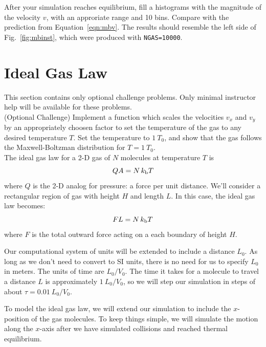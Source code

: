 {\plot After your simulation reaches equilibrium, fill a histograms
with the magnitude of the velocity $v$, with an approriate range and
10 bins.  Compare with the prediction from Equation~\ref{eqn:mbv}.
The results should resemble the left side of Fig.~\ref{fig:mbinst},
which were produced with {\tt NGAS=10000}.\\

\section{Ideal Gas Law}
\label{sec:idealgas}

This section contains only optional challenge problems.  Only minimal
instructor help will be available for these problems.\\

\plot (Optional Challenge) Implement a function which scales the
velocities $v_x$ and $v_y$ by an appropriately choosen factor to set
the temperature of the gas to any desired temperature $T$.  Set the
temperature to $1~T_0$, and show that the gas follows the
Maxwell-Boltzman distribution for $T=1~T_0$.\\

The ideal gas law for a 2-D gas of $N$ molecules at temperature $T$ is
\begin{displaymath}
  Q A = N \, k_{\rm b} T
\end{displaymath}
where $Q$ is the 2-D analog for pressure: a force per unit distance.
We'll consider a rectangular region of gas with height $H$ and length
$L$.  In this case, the ideal gas law becomes:
\begin{displaymath}
  F L = N \, k_{\rm b} T
\end{displaymath}
where $F$ is the total outward force acting on a each boundary of height $H$.

Our computational system of units will be extended to include a
distance $L_0$.  As long as we don't need to convert to SI units,
there is no need for us to specify $L_0$ in meters.  The units of time
are $L_0/V_0$.  The time it takes for a molecule to travel a distance
$L$ is approximately $1~L_0/V_0$, so we will step our simulation in
steps of about $\tau=0.01~L_0/V_0$.

To model the ideal gas law, we will extend our simulation to include
the $x$-position of the gas molecules.  To keep things simple, we will
simulate the motion along the $x$-axis after we have simulated
collisions and reached thermal equilibrium.

}

